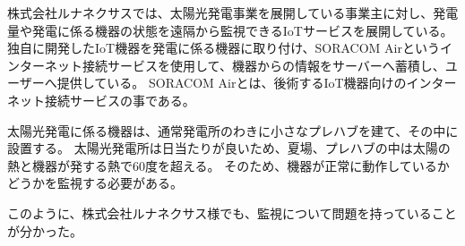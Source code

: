 
\begin{comment}
また、IoTサービスを開発しているルナネクサスさんへ聞き取りを行った。
・ルナネクサスさんの説明
・ルナネクサスさんが開発しているサービスの説明
・どのような点で困っているのか、等の聞き取り結果
\end{comment}

株式会社ルナネクサスでは、太陽光発電事業を展開している事業主に対し、発電量や発電に係る機器の状態を遠隔から監視できるIoTサービスを展開している。
独自に開発したIoT機器を発電に係る機器に取り付け、SORACOM Airというインターネット接続サービスを使用して、機器からの情報をサーバーへ蓄積し、ユーザーへ提供している。
SORACOM Airとは、後術するIoT機器向けのインターネット接続サービスの事である。

太陽光発電に係る機器は、通常発電所のわきに小さなプレハブを建て、その中に設置する。
太陽光発電所は日当たりが良いため、夏場、プレハブの中は太陽の熱と機器が発する熱で60度を超える。
そのため、機器が正常に動作しているかどうかを監視する必要がある。

このように、株式会社ルナネクサス様でも、監視について問題を持っていることが分かった。
